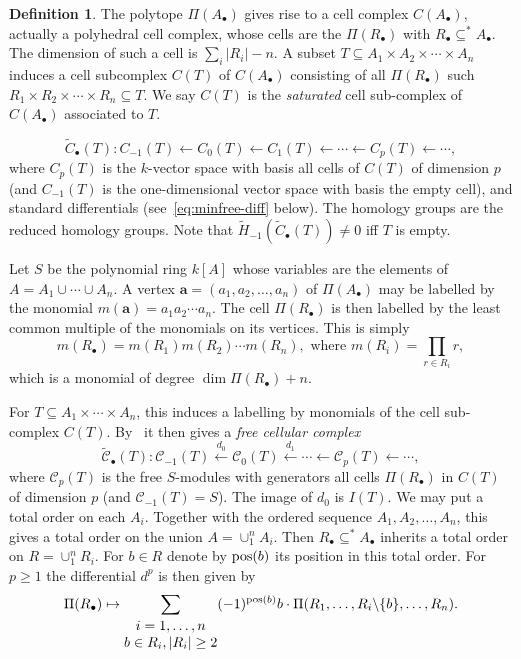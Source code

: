\documentclass[10pt,a4paper]{article}
\theoremstyle{definition}
\newtheorem{defi}[cdrthm]{Definition}
\theoremstyle{remark}
\newcommand{\Cgeo}{C}
\newcommand{\susst}{\subseteq^*}
\newcommand{\Ctbu}{\tilde{C}_{\bullet}}
\newcommand{\Ctalg}{\tilde{{\mathcal C}}_{\bullet}}
\newcommand{\Cal}{{\mathcal C}}
\theoremstyle{plain}
\newcommand{\sus}{\subseteq}
\newcommand{\vpil}{\leftarrow}
\newcommand{\vmto}[1]{\stackrel{#1}\longleftarrow}
\newcommand{\bfa}{{\mathbf a}}
\newcommand{\Ab}{A_\bullet}
\newcommand{\Rb}{R_\bullet}
\newcommand{\pot}{{\rm{pos}}}
\begin{document}
\begin{defi}
  The polytope $\Pi(\Ab)$ gives rise to a cell complex $\Cgeo(\Ab)$,
  actually a polyhedral cell complex,
whose cells are the $\Pi(\Rb)$ with $\Rb \susst \Ab$. 
The dimension of such a cell is $\sum_i |R_i| - n$.
A subset $T \sus A_1 \times A_2 \times \cdots \times A_n$
induces a cell subcomplex $C(T)$ of $\Cgeo(\Ab)$ consisting of all
$\Pi(\Rb)$ such
$R_1 \times R_2 \times \cdots \times R_n \sus T$.
We say $C(T)$ is the {\it saturated} cell sub-complex of
$\Cgeo(\Ab)$ associated to $T$. 
\end{defi}

\medskip
{}
\begin{equation} \label{eq:minfree-Ct}
  \Ctbu(T): C_{-1}(T) \vpil C_0(T) \vpil C_1(T) \vpil
  \cdots \vpil C_p(T) \vpil \cdots ,
\end{equation}
where $C_p(T)$ is the $k$-vector space with basis all cells
of $\Cgeo(T)$ of dimension $p$ (and $C_{-1}(T)$ is the one-dimensional
vector space with basis the empty cell), and standard differentials
(see~\eqref{eq:minfree-diff} below). The homology groups are the
reduced homology groups. Note that $\tilde{H}_{-1}(\Ctbu(T)) \neq 0$ iff
$T$ is empty. 

Let $S$ be the polynomial ring $k[A]$ whose variables
are the elements of $A = A_1 \cup \cdots \cup A_n$. 
A vertex $\bfa = (a_1,a_2, \ldots, a_n)$ of $\Pi(\Ab)$
may be labelled by the monomial
$m(\bfa) = a_1a_2\cdots a_n$. The cell $\Pi(\Rb)$ is then labelled by
the least common multiple of the monomials on its vertices. This is
simply
\[ m(\Rb) = m(R_1)m(R_2) \cdots m(R_n), \text{ where }
  m(R_i) = \prod_{r \in R_i}r,\]
which is a monomial of degree $\dim \Pi(\Rb) + n$. 

\medskip
{}
  For $T \sus A_1 \times \cdots \times A_n$, this induces a labelling
by monomials of the cell sub-complex $\Cgeo(T)$.
By~\cite[Section 4]{MiSt} it then gives a {\it free cellular complex}
\[ \Ctalg(T) : \Cal_{-1}(T) \vmto{d_0} \Cal_0(T) \vmto{d_1}
  \cdots \vpil \Cal_p(T) \vpil \cdots , \]
where
$\Cal_p(T)$ is the free $S$-modules with generators all cells $\Pi(\Rb)$ in
$\Cgeo(T)$ of dimension $p$ (and $\Cal_{-1}(T) = S$).
The image of $d_0$ is $I(T)$.
We may put a total order on each $A_i$. Together with the ordered
sequence $A_1, A_2, \ldots, A_n$, this gives a total order on the
union $A = \cup_1^n A_i$. Then $\Rb \sus^{*} \Ab$ inherits a total order on
$R = \cup_1^n R_i$. For $b \in R$ denote by $\pot(b)$ its position in
this total order. For $p \geq 1$
the differential $d^p$ is then given by
\begin{equation} \label{eq:minfree-diff}
  \Pi(\Rb) \mapsto \sum_{\begin{matrix} i = 1, \ldots, n\\
      b \in R_i, |R_i| \geq 2 \end{matrix}}  (-1)^{\pot(b)} b \cdot
  \Pi(R_1, \ldots, R_i\backslash \{b \}, \ldots, R_n).
\end{equation}
\end{document}
